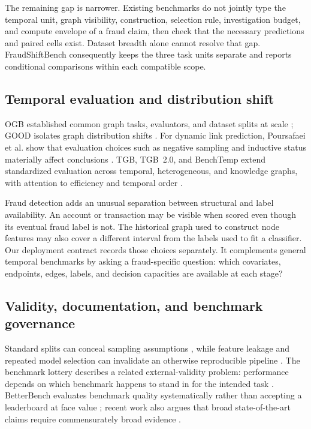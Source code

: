 The remaining gap is narrower. Existing benchmarks do not jointly type the temporal unit, graph visibility, construction, selection rule, investigation budget, and compute envelope of a fraud claim, then check that the necessary predictions and paired cells exist. Dataset breadth alone cannot resolve that gap. FraudShiftBench consequently keeps the three task units separate and reports conditional comparisons within each compatible scope.

\subsection{Temporal evaluation and distribution shift}
OGB established common graph tasks, evaluators, and dataset splits at scale \cite{hu2020ogb}; GOOD isolates graph distribution shifts \cite{gui2022good}. For dynamic link prediction, Poursafaei et al. show that evaluation choices such as negative sampling and inductive status materially affect conclusions \cite{poursafaei2022better}. TGB, TGB~2.0, and BenchTemp extend standardized evaluation across temporal, heterogeneous, and knowledge graphs, with attention to efficiency and temporal order \cite{huang2023tgb,gastinger2024tgb2,huang2024benchtemp}.

Fraud detection adds an unusual separation between structural and label availability. An account or transaction may be visible when scored even though its eventual fraud label is not. The historical graph used to construct node features may also cover a different interval from the labels used to fit a classifier. Our deployment contract records those choices separately. It complements general temporal benchmarks by asking a fraud-specific question: which covariates, endpoints, edges, labels, and decision capacities are available at each stage?

\subsection{Validity, documentation, and benchmark governance}
Standard splits can conceal sampling assumptions \cite{gorman2019splits}, while feature leakage and repeated model selection can invalidate an otherwise reproducible pipeline \cite{kaufman2012leakage,cawley2010selection,kapoor2023leakage}. The benchmark lottery describes a related external-validity problem: performance depends on which benchmark happens to stand in for the intended task \cite{dehghani2021lottery}. BetterBench evaluates benchmark quality systematically rather than accepting a leaderboard at face value \cite{reuel2024betterbench}; recent work also argues that broad state-of-the-art claims require commensurately broad evidence \cite{oh2026sota}.


